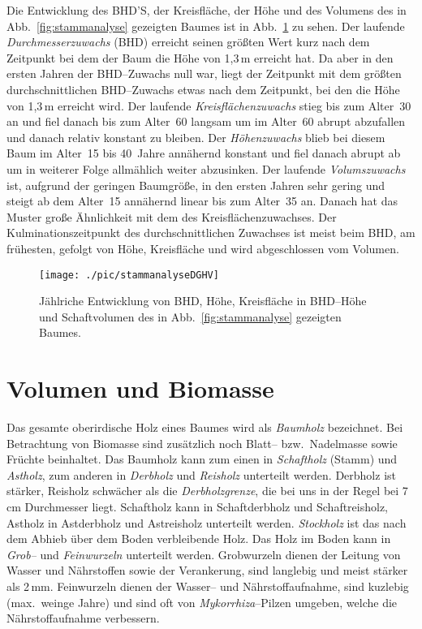 \documentclass[twocolumn]{scrartcl}
\begin{document}

Die Entwicklung des BHD'S, der Kreisfläche, der Höhe und des Volumens des in
Abb.~\ref{fig:stammanalyse} gezeigten Baumes ist in
Abb.~\ref{fig:stammanalyseDGHV} zu sehen. Der laufende \emph{Durchmesserzuwachs}
(BHD) erreicht seinen größten Wert kurz nach dem Zeitpunkt bei dem der Baum die
Höhe von 1,3\,m erreicht hat. Da aber in den ersten Jahren der BHD--Zuwachs null
war, liegt der Zeitpunkt mit dem größten durchschnittlichen BHD--Zuwachs etwas
nach dem Zeitpunkt, bei den die Höhe von 1,3\,m erreicht wird. Der laufende
\emph{Kreisflächenzuwachs} stieg bis zum Alter~30 an und fiel danach bis zum
Alter~60 langsam um im Alter~60 abrupt abzufallen und danach relativ konstant zu
bleiben. Der \emph{Höhenzuwachs} blieb bei diesem Baum im Alter~15 bis 40~Jahre
annähernd konstant und fiel danach abrupt ab um in weiterer Folge allmählich
weiter abzusinken. Der laufende \emph{Volumszuwachs} ist, aufgrund der geringen
Baumgröße, in den ersten Jahren sehr gering und steigt ab dem Alter~15 annähernd
linear bis zum Alter~35 an. Danach hat das Muster große Ähnlichkeit mit dem des
Kreisflächenzuwachses. Der Kulminationszeitpunkt des durchschnittlichen
Zuwachses ist meist beim BHD, am frühesten, gefolgt von Höhe, Kreisfläche und
wird abgeschlossen vom Volumen.

\begin{figure}[htbp]
  \centering
  \texttt{[image: ./pic/stammanalyseDGHV]}
  \caption{Jählriche Entwicklung von BHD, Höhe, Kreisfläche in BHD--Höhe und
  Schaftvolumen des in Abb.~\ref{fig:stammanalyse} gezeigten Baumes.}
  \label{fig:stammanalyseDGHV}
\end{figure}

\section{Volumen und Biomasse}

Das gesamte oberirdische Holz eines Baumes wird als
\emph{Baumholz} bezeichnet. Bei Betrachtung von Biomasse sind
zusätzlich noch Blatt-- bzw.\ Nadelmasse sowie Früchte beinhaltet. Das Baumholz
kann zum einen in \emph{Schaftholz} (Stamm) und
\emph{Astholz}, zum anderen in \emph{Derbholz}
und \emph{Reisholz} unterteilt werden. Derbholz ist stärker,
Reisholz schwächer als die \emph{Derbholzgrenze}, die bei
uns in der Regel bei 7\,cm Durchmesser liegt. Schaftholz kann in Schaftderbholz
und Schaftreisholz, Astholz in Astderbholz und Astreisholz unterteilt werden.
\emph{Stockholz} ist das nach dem Abhieb über dem Boden
verbleibende Holz. Das Holz im Boden kann in \emph{Grob--}
und \emph{Feinwurzeln} unterteilt werden. Grobwurzeln dienen
der Leitung von Wasser und Nährstoffen sowie der Verankerung, sind langlebig und
meist stärker als 2\,mm. Feinwurzeln dienen der Wasser-- und Nährstoffaufnahme,
sind kuzlebig (max.\ weinge Jahre) und sind oft von
\emph{Mykorrhiza}--Pilzen umgeben, welche die
Nährstoffaufnahme verbessern.
\end{document}
